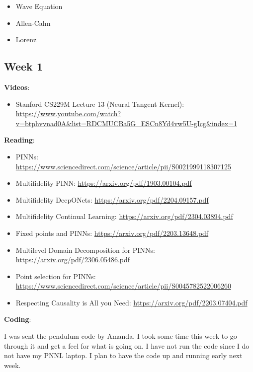 \documentclass{article}
\def\bf{\textbf}
\begin{document}
\begin{itemize}
	\item Wave Equation
	\item Allen-Cahn
	\item Lorenz
\end{itemize}

\newpage
\newpage
\subsection*{Week 1}
\bf{Videos}:
\begin{itemize}
	\item Stanford CS229M Lecture 13 (Neural Tangent Kernel): \url{https://www.youtube.com/watch?v=btphvvnad0A&list=RDCMUCBa5G_ESCn8Yd4vw5U-gIcg&index=1}
\end{itemize}
\bf{Reading}:
\begin{itemize}
	\item PINNs: \url{https://www.sciencedirect.com/science/article/pii/S0021999118307125}
	\item Multifidelity PINN: \url{https://arxiv.org/pdf/1903.00104.pdf}
	\item Multifidelity DeepONets: \url{https://arxiv.org/pdf/2204.09157.pdf}
	\item Multifidelity Continual Learning: \url{https://arxiv.org/pdf/2304.03894.pdf}
	\item Fixed points and PINNs: \url{https://arxiv.org/pdf/2203.13648.pdf}
	\item Multilevel Domain Decomposition for PINNs: \url{https://arxiv.org/pdf/2306.05486.pdf}
	\item Point selection for PINNs: \url{https://www.sciencedirect.com/science/article/pii/S0045782522006260}
	\item Respecting Causality is All you Need: \url{https://arxiv.org/pdf/2203.07404.pdf}
\end{itemize}
\bf{Coding}:\\
\par I was sent the pendulum code by Amanda. I took some time this week to go through it and get a feel for what is going on. I have not run the code since I do not have my PNNL laptop. I plan to have the code up and running early next week.
\end{document}
